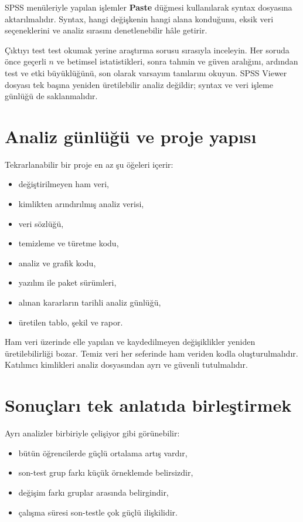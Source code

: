 SPSS menüleriyle yapılan işlemler \textbf{Paste} düğmesi kullanılarak syntax
dosyasına aktarılmalıdır. Syntax, hangi değişkenin hangi alana konduğunu,
eksik veri seçeneklerini ve analiz sırasını denetlenebilir hâle getirir.

\begin{outputguidebox}
Çıktıyı test test okumak yerine araştırma sorusu sırasıyla inceleyin. Her
soruda önce geçerli $n$ ve betimsel istatistikleri, sonra tahmin ve güven
aralığını, ardından test ve etki büyüklüğünü, son olarak varsayım tanılarını
okuyun. SPSS Viewer dosyası tek başına yeniden üretilebilir analiz değildir;
syntax ve veri işleme günlüğü de saklanmalıdır.
\end{outputguidebox}

\section{Analiz günlüğü ve proje yapısı}

Tekrarlanabilir bir proje en az şu öğeleri içerir:

\begin{itemize}
  \item değiştirilmeyen ham veri,
  \item kimlikten arındırılmış analiz verisi,
  \item veri sözlüğü,
  \item temizleme ve türetme kodu,
  \item analiz ve grafik kodu,
  \item yazılım ile paket sürümleri,
  \item alınan kararların tarihli analiz günlüğü,
  \item üretilen tablo, şekil ve rapor.
\end{itemize}

Ham veri üzerinde elle yapılan ve kaydedilmeyen değişiklikler yeniden
üretilebilirliği bozar. Temiz veri her seferinde ham veriden kodla
oluşturulmalıdır. Katılımcı kimlikleri analiz dosyasından ayrı ve güvenli
tutulmalıdır.

\section{Sonuçları tek anlatıda birleştirmek}

Ayrı analizler birbiriyle çelişiyor gibi görünebilir:

\begin{itemize}
  \item bütün öğrencilerde güçlü ortalama artış vardır,
  \item son-test grup farkı küçük örneklemde belirsizdir,
  \item değişim farkı gruplar arasında belirgindir,
  \item çalışma süresi son-testle çok güçlü ilişkilidir.
\end{itemize}

